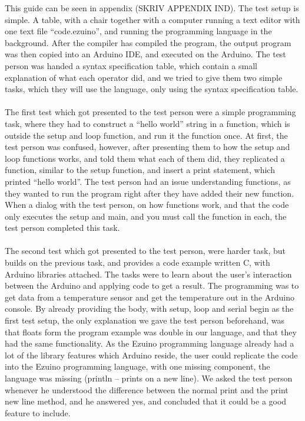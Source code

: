 This guide can be seen in appendix (SKRIV APPENDIX IND).  
The test setup is simple. A table, with a chair together with a computer running a text editor with one text file “code.ezuino”, and running the programming language in the background. After the compiler has compiled the program, the output program was then copied into an Arduino IDE, and executed on the Arduino. The test person was handed a syntax specification table, which contain a small explanation of what each operator did, and we tried to give them two simple tasks, which they will use the language, only using the syntax specification table. \\
\\
The first test which got presented to the test person were a simple programming task, where they had to construct a “hello world” string in a function, which is outside the setup and loop function, and run it the function once. At first, the test person was confused, however, after presenting them to how the setup and loop functions works, and told them what each of them did, they replicated a function, similar to the setup function, and insert a print statement, which printed “hello world”. The test person had an issue understanding functions, as they wanted to run the program right after they have added their new function. When a dialog with the test person, on how functions work, and that the code only executes the setup and main, and you must call the function in each, the test person completed this task.\\
\\
The second test which got presented to the test person, were harder task, but builds on the previous task, and provides a code example written C, with Arduino libraries attached. The tasks were to learn about the user’s interaction between the Arduino and applying code to get a result. The programming was to get data from a temperature sensor and get the temperature out in the Arduino console. By already providing the body, with setup, loop and serial begin as the first test setup, the only explanation we gave the test person beforehand, was that floats form the program example was double in our language, and that they had the same functionality. As the Ezuino programming language already had a lot of the library features which Arduino reside, the user could replicate the code into the Ezuino programming language, with one missing component, the language was missing (println – prints on a new line). We asked the test person whenever he understood the difference between the normal print and the print new line method, and he answered yes, and concluded that it could be a good feature to include.\\
